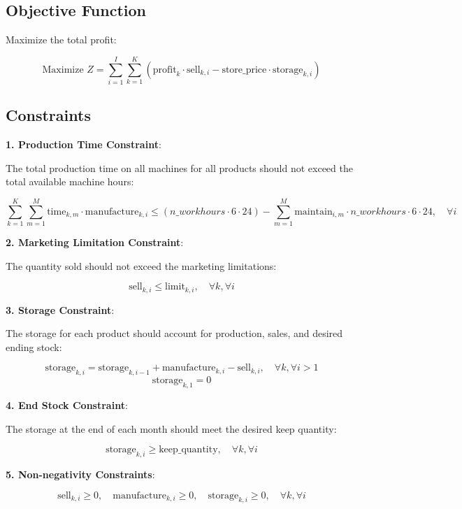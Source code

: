 \documentclass{article}
\begin{document}
\subsection*{Objective Function}
Maximize the total profit:

\[
\text{Maximize } Z = \sum_{i=1}^{I} \sum_{k=1}^{K} \left( \text{profit}_k \cdot \text{sell}_{k,i} - \text{store\_price} \cdot \text{storage}_{k,i} \right)
\]

\subsection*{Constraints}

\textbf{1. Production Time Constraint}:

The total production time on all machines for all products should not exceed the total available machine hours:

\[
\sum_{k=1}^{K} \sum_{m=1}^{M} \text{time}_{k,m} \cdot \text{manufacture}_{k,i} \leq (n\_workhours \cdot 6 \cdot 24) - \sum_{m=1}^{M} \text{maintain}_{i,m} \cdot n\_workhours \cdot 6 \cdot 24, \quad \forall i
\]

\textbf{2. Marketing Limitation Constraint}:

The quantity sold should not exceed the marketing limitations:

\[
\text{sell}_{k,i} \leq \text{limit}_{k,i}, \quad \forall k, \forall i
\]

\textbf{3. Storage Constraint}:

The storage for each product should account for production, sales, and desired ending stock:

\[
\text{storage}_{k,i} = \text{storage}_{k,i-1} + \text{manufacture}_{k,i} - \text{sell}_{k,i}, \quad \forall k, \forall i > 1
\]
\[
\text{storage}_{k,1} = 0
\]

\textbf{4. End Stock Constraint}:

The storage at the end of each month should meet the desired keep quantity:

\[
\text{storage}_{k,i} \geq \text{keep\_quantity}, \quad \forall k, \forall i
\]

\textbf{5. Non-negativity Constraints}:

\[
\text{sell}_{k,i} \geq 0, \quad \text{manufacture}_{k,i} \geq 0, \quad \text{storage}_{k,i} \geq 0, \quad \forall k, \forall i
\]
\end{document}
